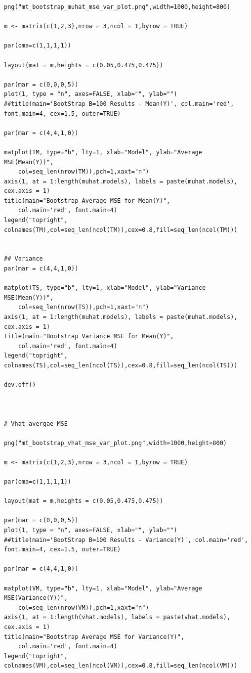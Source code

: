 \documentclass[twoside,12pt]{article}
\begin{document}
\begin{verbatim}
png("mt_bootstrap_muhat_mse_var_plot.png",width=1000,height=800)

m <- matrix(c(1,2,3),nrow = 3,ncol = 1,byrow = TRUE)

par(oma=c(1,1,1,1))

layout(mat = m,heights = c(0.05,0.475,0.475))

par(mar = c(0,0,0,5))
plot(1, type = "n", axes=FALSE, xlab="", ylab="")
##title(main='BootStrap B=100 Results - Mean(Y)', col.main='red', font.main=4, cex=1.5, outer=TRUE)

par(mar = c(4,4,1,0))

matplot(TM, type="b", lty=1, xlab="Model", ylab="Average MSE(Mean(Y))",
	col=seq_len(nrow(TM)),pch=1,xaxt="n")
axis(1, at = 1:length(muhat.models), labels = paste(muhat.models), cex.axis = 1)
title(main="Bootstrap Average MSE for Mean(Y)",
	col.main='red', font.main=4)
legend("topright", colnames(TM),col=seq_len(ncol(TM)),cex=0.8,fill=seq_len(ncol(TM)))


## Variance 
par(mar = c(4,4,1,0))

matplot(TS, type="b", lty=1, xlab="Model", ylab="Variance MSE(Mean(Y))",
	col=seq_len(nrow(TS)),pch=1,xaxt="n")
axis(1, at = 1:length(muhat.models), labels = paste(muhat.models), cex.axis = 1)
title(main="Bootstrap Variance MSE for Mean(Y)",
	col.main='red', font.main=4)
legend("topright", colnames(TS),col=seq_len(ncol(TS)),cex=0.8,fill=seq_len(ncol(TS)))

dev.off()



# Vhat avergae MSE

png("mt_bootstrap_vhat_mse_var_plot.png",width=1000,height=800)

m <- matrix(c(1,2,3),nrow = 3,ncol = 1,byrow = TRUE)

par(oma=c(1,1,1,1))

layout(mat = m,heights = c(0.05,0.475,0.475))

par(mar = c(0,0,0,5))
plot(1, type = "n", axes=FALSE, xlab="", ylab="")
##title(main='BootStrap B=100 Results - Variance(Y)', col.main='red', font.main=4, cex=1.5, outer=TRUE)

par(mar = c(4,4,1,0))

matplot(VM, type="b", lty=1, xlab="Model", ylab="Average MSE(Variance(Y))",
	col=seq_len(nrow(VM)),pch=1,xaxt="n")
axis(1, at = 1:length(vhat.models), labels = paste(vhat.models), cex.axis = 1)
title(main="Bootstrap Average MSE for Variance(Y)",
	col.main='red', font.main=4)
legend("topright", colnames(VM),col=seq_len(ncol(VM)),cex=0.8,fill=seq_len(ncol(VM)))



\end{verbatim}
\end{document}
